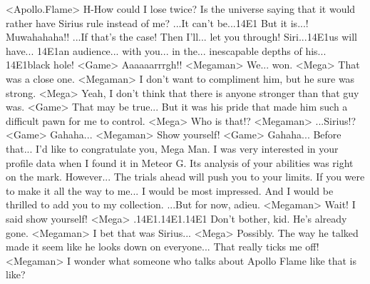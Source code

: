 <Apollo.Flame> H-How could I lose twice? 
Is the universe saying that it would rather have Sirius rule instead of me? 
...It can't be...{14}{E1} But it is...! 
Muwahahaha!! 
...If that's the case! Then I'll... let you through! 
Siri...{14}{E1}us will have... {14}{E1}an audience... with you... in 
the... inescapable depths of his... {14}{E1}black hole! 
<Game> Aaaaaarrrgh!! 
<Megaman> We... won. 
<Mega> That was a close one. 
<Megaman> I don't want to compliment him, but he sure was strong. 
<Mega> Yeah, I don't think that there is anyone stronger than that guy was. 
<Game> That may be true... 
But it was his pride that made him such a difficult pawn for me to control. 
<Mega> Who is that!? 
<Megaman> ...Sirius!? 
<Game> Gahaha... 
<Megaman> Show yourself! 
<Game> Gahaha... 
Before that... I'd like to congratulate you, Mega Man. 
I was very interested in your profile data when I found it in Meteor G. 
Its analysis of your abilities was right on the mark. 
However... The trials ahead will push you to your limits. 
If you were to make it all the way to me... 
I would be most impressed. 
And I would be thrilled to add you to my collection. 
...But for now, adieu. 
<Megaman> Wait! I said show yourself! 
<Mega> .{14}{E1}.{14}{E1}.{14}{E1} 
Don't bother, kid. He's already gone. 
<Megaman> I bet that was Sirius... 
<Mega> Possibly. 
The way he talked made it seem like he looks down on everyone... 
That really ticks me off! 
<Megaman> I wonder what someone who talks about Apollo Flame like that is like? 

